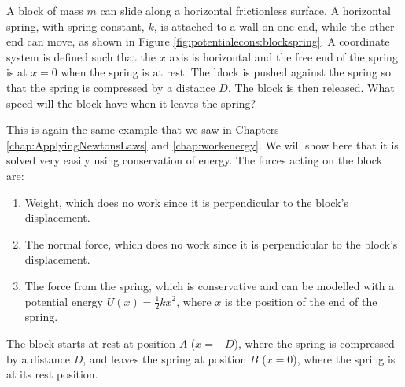 \vspace{-0.35cm}
\begin{example}{\label{ex:potentialecons:blockspring}

A block of mass $m$ can slide along a horizontal frictionless surface. A horizontal spring, with spring constant, $k$, is attached to a wall on one end, while the other end can move, as shown in Figure \ref{fig:potentialecons:blockspring}. A coordinate system is defined such that the $x$ axis is horizontal and the free end of the spring is at $x=0$ when the spring is at rest. The block is pushed against the spring so that the spring is compressed by a distance $D$. The block is then released. What speed will the block have when it leaves the spring?}
This is again the same example that we saw in Chapters \ref{chap:ApplyingNewtonsLaws} and \ref{chap:workenergy}. We will show here that it is solved very easily using conservation of energy. The forces acting on the block are:
\begin{enumerate}
\item Weight, which does no work since it is perpendicular to the block's displacement.
\item The normal force, which does no work since it is perpendicular to the block's displacement.
\item The force from the spring, which is conservative and can be modelled with a potential energy $U(x)=\frac{1}{2}kx^2$, where $x$ is the position of the end of the spring.
\end{enumerate}

The block starts at rest at position $A$ ($x=-D$), where the spring is compressed by a distance $D$, and leaves the spring at position $B$ ($x=0$), where the spring is at its rest position. 


\end{example}
